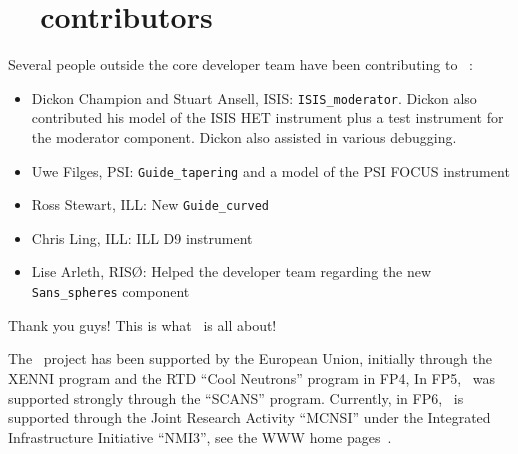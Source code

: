 \section*{\MCS\ \version\ contributors}
Several people outside the core developer team have been contributing
to \MCS\ \version:
\begin{itemize}
\item{Dickon Champion and Stuart Ansell, ISIS:
    \verb+ISIS_moderator+. Dickon also contributed his model of the
    ISIS HET instrument plus a test instrument for the moderator
    component. Dickon also assisted in various debugging.}
\item{Uwe Filges, PSI: \verb+Guide_tapering+ and a model of the PSI
    FOCUS instrument}
\item{Ross Stewart, ILL: New \verb+Guide_curved+}
\item{Chris Ling, ILL: ILL D9 instrument}
\item{Lise Arleth, RIS\O: Helped the developer team regarding the new
  \verb+Sans_spheres+ component}
\end{itemize}
Thank you guys! This is what \MCS\ is all about!

The \MCS\ project has been supported by the European Union, initially
through the XENNI program and the RTD ``Cool Neutrons'' program in FP4,
In FP5, \MCS\ was supported strongly through the
``SCANS'' program.
Currently, in FP6, \MCS\ is supported through the Joint Research Activity
``MCNSI'' under the Integrated Infrastructure Initiative ``NMI3'', see
the WWW home pages~\cite{mcnsi_webpage,nmi3_webpage}.
